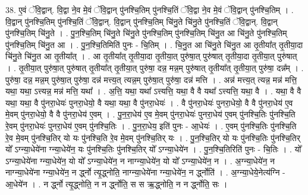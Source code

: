 \documentclass[17pt]{extarticle}
\begin{document}
38. ए॒वं ॅवि॒द्वान्. वि॒द्वा ने॒व मे॒वं ॅवि॒द्वान् पु॑नश्चि॒तिम् पु॑नश्चि॒तिं ॅवि॒द्वा ने॒व मे॒वं ॅवि॒द्वान् पु॑नश्चि॒तिम् । . वि॒द्वान् पु॑नश्चि॒तिम् पु॑नश्चि॒तिं ॅवि॒द्वान्. वि॒द्वान् पु॑नश्चि॒तिम् चि॑नु॒ते चि॑नु॒ते पु॑नश्चि॒तिं ॅवि॒द्वान्. वि॒द्वान् पु॑नश्चि॒तिम् चि॑नु॒ते । . पु॒न॒श्चि॒तिम् चि॑नु॒ते चि॑नु॒ते पु॑नश्चि॒तिम् पु॑नश्चि॒तिम् चि॑नु॒त आ चि॑नु॒ते पु॑नश्चि॒तिम् पु॑नश्चि॒तिम् चि॑नु॒त आ । . पु॒न॒श्चि॒तिमिति॑ पुनः - चि॒तिम् । . चि॒नु॒त आ चि॑नु॒ते चि॑नु॒त आ तृ॒तीया᳚त् तृ॒तीया॒दा चि॑नु॒ते चि॑नु॒त आ तृ॒तीया᳚त् । . आ तृ॒तीया᳚त् तृ॒तीया॒दा तृ॒तीया॒त् पुरु॑षा॒त् पुरु॑षात् तृ॒तीया॒दा तृ॒तीया॒त् पुरु॑षात् । . तृ॒तीया॒त् पुरु॑षा॒त् पुरु॑षात् तृ॒तीया᳚त् तृ॒तीया॒त् पुरु॑षा॒ दन्न॒ मन्न॒म् पुरु॑षात् तृ॒तीया᳚त् तृ॒तीया॒त् पुरु॑षा॒ दन्न᳚म् । . पुरु॑षा॒ दन्न॒ मन्न॒म् पुरु॑षा॒त् पुरु॑षा॒ दन्न॑ मत्त्य॒त् त्यन्न॒म् पुरु॑षा॒त् पुरु॑षा॒ दन्न॑ मत्ति । . अन्न॑ मत्त्य॒त् त्यन्न॒ मन्न॑ मत्ति॒ यथा॒ यथा॒ ऽत्त्यन्न॒ मन्न॑ मत्ति॒ यथा᳚ । . अ॒त्ति॒ यथा॒ यथा᳚ ऽत्त्यत्ति॒ यथा॒ वै वै यथा᳚ ऽत्त्यत्ति॒ यथा॒ वै । . यथा॒ वै वै यथा॒ यथा॒ वै पु॑नरा॒धेयः॑ पुनरा॒धेयो॒ वै यथा॒ यथा॒ वै पु॑नरा॒धेयः॑ । . वै पु॑नरा॒धेयः॑ पुनरा॒धेयो॒ वै वै पु॑नरा॒धेय॑ ए॒व मे॒वम् पु॑नरा॒धेयो॒ वै वै पु॑नरा॒धेय॑ ए॒वम् । . पु॒न॒रा॒धेय॑ ए॒व मे॒वम् पु॑नरा॒धेयः॑ पुनरा॒धेय॑ ए॒वम् पु॑नश्चि॒तिः पु॑नश्चि॒ति रे॒वम् पु॑नरा॒धेयः॑ पुनरा॒धेय॑ ए॒वम् पु॑नश्चि॒तिः । . पु॒न॒रा॒धेय॒ इति॑ पुनः - आ॒धेयः॑ । . ए॒वम् पु॑नश्चि॒तिः पु॑नश्चि॒ति रे॒व मे॒वम् पु॑नश्चि॒तिर् यो यः पु॑नश्चि॒ति रे॒व मे॒वम् पु॑नश्चि॒तिर् यः । . पु॒न॒श्चि॒तिर् यो यः पु॑नश्चि॒तिः पु॑नश्चि॒तिर् यो᳚ ऽग्न्या॒धेये॑ना ग्न्या॒धेये॑न॒ यः पु॑नश्चि॒तिः पु॑नश्चि॒तिर् यो᳚ ऽग्न्या॒धेये॑न । . पु॒न॒श्चि॒तिरिति॑ पुनः - चि॒तिः । . यो᳚ ऽग्न्या॒धेये॑ना ग्न्या॒धेये॑न॒ यो यो᳚ ऽग्न्या॒धेये॑न॒ न नाग्न्या॒धेये॑न॒ यो यो᳚ ऽग्न्या॒धेये॑न॒ न । . अ॒ग्न्या॒धेये॑न॒ न नाग्न्या॒धेये॑ना ग्न्या॒धेये॑न॒ न र्द्ध्नो त्यृ॒द्ध्नोति॒ नाग्न्या॒धेये॑ना ग्न्या॒धेये॑न॒ न र्द्ध्नोति॑ । . अ॒ग्न्या॒धेये॒नेत्य॑ग्नि - आ॒धेये॑न । . न र्द्ध्नो त्यृ॒द्ध्नोति॒ न न र्द्ध्नोति॒ स स ऋ॒द्ध्नोति॒ न न र्द्ध्नोति॒ सः । \newline
\pagebreak
{}
\end{document}
